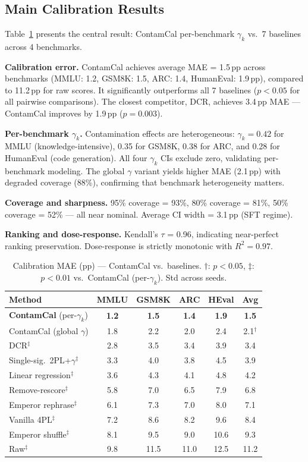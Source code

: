 \documentclass[letterpaper]{article}
\begin{document}
\subsection{Main Calibration Results}
\label{sec:calibration}

Table~\ref{tab:main} presents the central result: ContamCal per-benchmark $\gamma_k$ vs.\ 7 baselines across 4 benchmarks.

\textbf{Calibration error.}
ContamCal achieves average MAE = 1.5\,pp across benchmarks (MMLU: 1.2, GSM8K: 1.5, ARC: 1.4, HumanEval: 1.9\,pp), compared to 11.2\,pp for raw scores.
It significantly outperforms all 7 baselines ($p < 0.05$ for all pairwise comparisons).
The closest competitor, DCR, achieves 3.4\,pp MAE --- ContamCal improves by 1.9\,pp ($p = 0.003$).

\textbf{Per-benchmark $\gamma_k$.}
Contamination effects are heterogeneous: $\gamma_k = 0.42$ for MMLU (knowledge-intensive), 0.35 for GSM8K, 0.38 for ARC, and 0.28 for HumanEval (code generation).
All four $\gamma_k$ CIs exclude zero, validating per-benchmark modeling.
The global $\gamma$ variant yields higher MAE (2.1\,pp) with degraded coverage (88\%), confirming that benchmark heterogeneity matters.

\textbf{Coverage and sharpness.}
95\% coverage = 93\%, 80\% coverage = 81\%, 50\% coverage = 52\% --- all near nominal.
Average CI width = 3.1\,pp (SFT regime).

\textbf{Ranking and dose-response.}
Kendall's $\tau$ = 0.96, indicating near-perfect ranking preservation.
Dose-response is strictly monotonic with $R^2 = 0.97$.

\begin{table}[t]
\centering
\caption{Calibration MAE (pp) --- ContamCal vs.\ baselines. $\dagger$: $p < 0.05$, $\ddagger$: $p < 0.01$ vs.\ ContamCal (per-$\gamma_k$). Std across seeds.}
\label{tab:main}
\begin{tabular}{lccccc}
\toprule
Method & MMLU & GSM8K & ARC & HEval & Avg \\
\midrule
\textbf{ContamCal} (per-$\gamma_k$) & \textbf{1.2} & \textbf{1.5} & \textbf{1.4} & \textbf{1.9} & \textbf{1.5} \\
ContamCal (global $\gamma$)  & 1.8 & 2.2 & 2.0 & 2.4 & 2.1$^\dagger$ \\
DCR$^\ddagger$               & 2.8 & 3.5 & 3.4 & 3.9 & 3.4 \\
Single-sig.\ 2PL+$\gamma^\ddagger$  & 3.3 & 4.0 & 3.8 & 4.5 & 3.9 \\
Linear regression$^\ddagger$ & 3.6 & 4.3 & 4.1 & 4.8 & 4.2 \\
Remove-rescore$^\ddagger$    & 5.8 & 7.0 & 6.5 & 7.9 & 6.8 \\
Emperor rephrase$^\ddagger$  & 6.1 & 7.3 & 7.0 & 8.0 & 7.1 \\
Vanilla 4PL$^\ddagger$       & 7.2 & 8.6 & 8.2 & 9.6 & 8.4 \\
Emperor shuffle$^\ddagger$   & 8.1 & 9.5 & 9.0 & 10.6 & 9.3 \\
Raw$^\ddagger$               & 9.8 & 11.5 & 11.0 & 12.5 & 11.2 \\
\bottomrule
\end{tabular}
\end{table}
\end{document}
